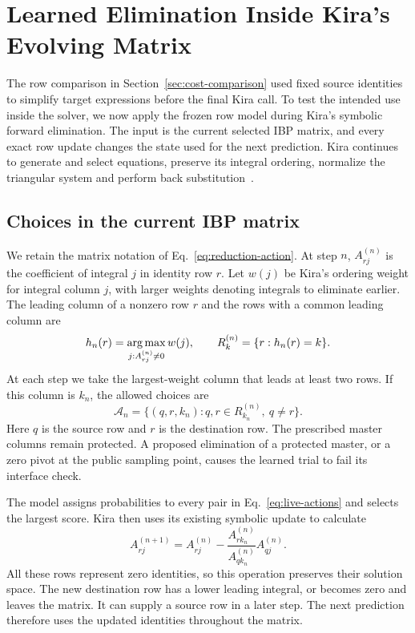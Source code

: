 \section{Learned Elimination Inside Kira's Evolving Matrix}
\label{sec:live-matrix}
The row comparison in Section~\ref{sec:cost-comparison} used fixed
source identities to simplify target expressions before the final Kira
call. To test the intended use inside the solver, we now apply the frozen
row model during Kira's symbolic forward elimination. The input is the
current selected IBP matrix, and every exact row update changes the state
used for the next prediction. Kira continues to generate and select
equations, preserve its integral ordering, normalize the triangular
system and perform back substitution~\cite{Kira3}.

\subsection{Choices in the current IBP matrix}
We retain the matrix notation of Eq.~\eqref{eq:reduction-action}.
At step $n$, $A^{(n)}_{rj}$ is the coefficient of integral $j$ in
identity row $r$.
Let $w(j)$ be Kira's ordering weight for integral column $j$, with larger
weights denoting integrals to eliminate earlier. The leading column of a
nonzero row $r$ and the rows with a common leading column are
\begin{equation}
 h_n(r)=\mathop{\rm arg\,max}_{j:A^{(n)}_{rj}\ne0}w(j),
 \qquad
 R_k^{(n)}=\{r:h_n(r)=k\}.
\end{equation}
At each step we take the largest-weight column that leads at least two
rows. If this column is $k_n$, the allowed choices are
\begin{equation}
 \mathcal A_n=
 \{(q,r,k_n):q,r\in R_{k_n}^{(n)},\ q\ne r\}.
 \label{eq:live-actions}
\end{equation}
Here $q$ is the source row and $r$ is the destination row.
The prescribed master columns remain protected. A proposed elimination
of a protected master, or a zero pivot at the public sampling point,
causes the learned trial to fail its interface check.

The model assigns probabilities to every pair in
Eq.~\eqref{eq:live-actions} and selects the largest score. Kira then uses
its existing symbolic update to calculate
\begin{equation}
 A^{(n+1)}_{rj}
 =A^{(n)}_{rj}
 -\frac{A^{(n)}_{rk_n}}{A^{(n)}_{qk_n}}A^{(n)}_{qj}.
 \label{eq:live-update}
\end{equation}
All these rows represent zero identities, so this operation preserves
their solution space. The new destination row has a lower leading
integral, or becomes zero and leaves the matrix. It can supply a source
row in a later step. The next prediction therefore uses the updated
identities throughout the matrix.

